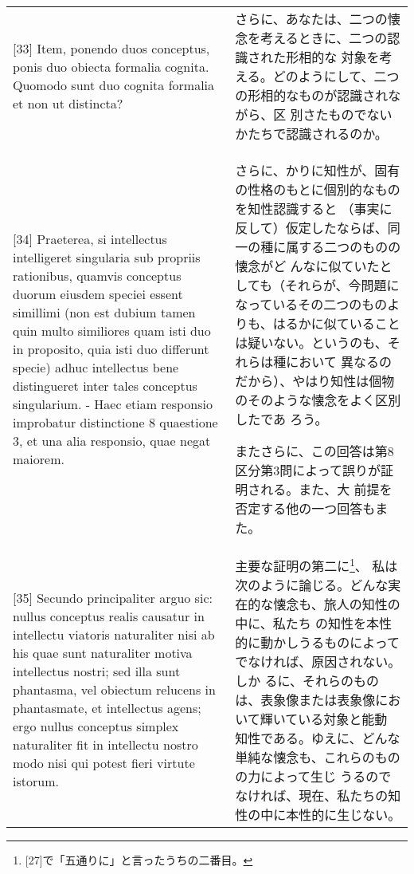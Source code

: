 \documentclass[paper=a4paper,fontsize=10pt,jafontsize=9pt,titlepage]{jlreq}
\begin{document}
\begin{longtable}{p{21em}p{21em}}
 \\

 [33] Item, ponendo duos conceptus, ponis duo obiecta formalia
 cognita. Quomodo sunt duo cognita formalia et non ut distincta?

 &

 さらに、あなたは、二つの懐念を考えるときに、二つの認識された形相的な
 対象を考える。どのようにして、二つの形相的なものが認識されながら、区
 別さたものでないかたちで認識されるのか。
 
 \\

 [34] Praeterea, si intellectus intelligeret singularia sub propriis
 rationibus, quamvis conceptus duorum eiusdem speciei essent simillimi
 (non est dubium tamen quin multo similiores quam isti duo in
 proposito, quia isti duo differunt specie) adhuc intellectus bene
 distingueret inter tales conceptus singularium. - Haec etiam
 responsio improbatur distinctione 8 quaestione 3, et una alia
 responsio, quae negat maiorem.

 &

 さらに、かりに知性が、固有の性格のもとに個別的なものを知性認識すると
 （事実に反して）仮定したならば、同一の種に属する二つのものの懐念がど
 んなに似ていたとしても（それらが、今問題になっているその二つのものよ
 りも、はるかに似ていることは疑いない。というのも、それらは種において
 異なるのだから）、やはり知性は個物のそのような懐念をよく区別したであ
 ろう。

 またさらに、この回答は第8区分第3問によって誤りが証明される。また、大
 前提を否定する他の一つ回答もまた。

 \\

 [35] Secundo principaliter arguo sic: nullus conceptus realis causatur
 in intellectu viatoris naturaliter nisi ab his quae sunt naturaliter
 motiva intellectus nostri; sed illa sunt phantasma, vel obiectum
 relucens in phantasmate, et intellectus agens; ergo nullus conceptus
 simplex naturaliter fit in intellectu nostro modo nisi qui potest
 fieri virtute istorum.

 &

 主要な証明の第二に\footnote{[27]で「五通りに」と言ったうちの二番目。}、
 私は次のように論じる。どんな実在的な懐念も、旅人の知性の中に、私たち
 の知性を本性的に動かしうるものによってでなければ、原因されない。しか
 るに、それらのものは、表象像または表象像において輝いている対象と能動
 知性である。ゆえに、どんな単純な懐念も、これらのものの力によって生じ
 うるのでなければ、現在、私たちの知性の中に本性的に生じない。


\end{longtable}
\end{document}
